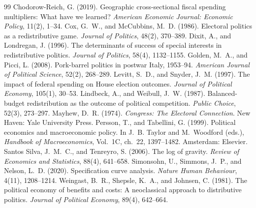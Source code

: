 \documentclass[12pt]{article}
\begin{document}
\begin{thebibliography}{99}
 Chodorow-Reich, G. (2019). Geographic cross-sectional fiscal spending multipliers: What have we learned? \emph{American Economic Journal: Economic Policy}, 11(2), 1--34.
 Cox, G.~W., and McCubbins, M.~D. (1986). Electoral politics as a redistributive game. \emph{Journal of Politics}, 48(2), 370--389.
 Dixit, A., and Londregan, J. (1996). The determinants of success of special interests in redistributive politics. \emph{Journal of Politics}, 58(4), 1132--1155.
 Golden, M.~A., and Picci, L. (2008). Pork-barrel politics in postwar Italy, 1953--94. \emph{American Journal of Political Science}, 52(2), 268--289.
 Levitt, S.~D., and Snyder, J.~M. (1997). The impact of federal spending on House election outcomes. \emph{Journal of Political Economy}, 105(1), 30--53.
 Lindbeck, A., and Weibull, J.~W. (1987). Balanced-budget redistribution as the outcome of political competition. \emph{Public Choice}, 52(3), 273--297.
 Mayhew, D.~R. (1974). \emph{Congress: The Electoral Connection}. New Haven: Yale University Press.
 Persson, T., and Tabellini, G. (1999). Political economics and macroeconomic policy. In J.~B. Taylor and M.~Woodford (eds.), \emph{Handbook of Macroeconomics}, Vol.~1C, ch.~22, 1397--1482. Amsterdam: Elsevier.
 Santos Silva, J.~M.~C., and Tenreyro, S. (2006). The log of gravity. \emph{Review of Economics and Statistics}, 88(4), 641--658.
 Simonsohn, U., Simmons, J.~P., and Nelson, L.~D. (2020). Specification curve analysis. \emph{Nature Human Behaviour}, 4(11), 1208--1214.
 Weingast, B.~R., Shepsle, K.~A., and Johnsen, C. (1981). The political economy of benefits and costs: A neoclassical approach to distributive politics. \emph{Journal of Political Economy}, 89(4), 642--664.
\end{thebibliography}
\end{document}
